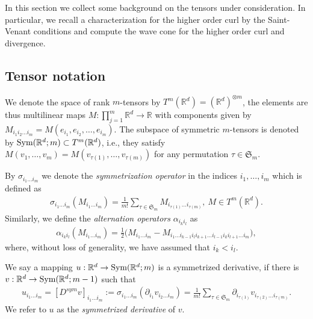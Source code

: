 \documentclass[a4paper, 10pt, twoside, notitlepage]{amsart}
\theoremstyle{plain}
\newcommand{\R}{\mathbb{R}}
\newcommand{\p}{\partial}
\renewcommand{\S}[1]{\textup{Sym}(\R^d;#1)}
\begin{document}
	In this section we collect some background on the tensors under consideration. In particular, we recall a characterization for the higher order curl by the Saint-Venant
	conditions and compute the wave cone for the higher order curl and divergence.
	
	\subsection{Tensor notation}
	\label{sec:tensors}
	
	We denote the space of rank $m$-tensors by $T^m(\R^d) = (\R^d)^{\otimes m}$, the elements are thus multilinear maps $M:\prod_{j=1}^m \R^d \to \R$ 
	with components given by $M_{i_1 i_2 \dots i_m} = M(e_{i_1},e_{i_2},\dots,e_{i_m})$.  The subspace of symmetric $m$-tensors is denoted by $\S{m} \subset T^m(\R^d)$, i.e., they satisfy
	$M(v_1,\dots,v_m) = M(v_{\tau(1)},\dots,v_{\tau(m)})$ for any permutation $\tau \in \mathfrak{S}_m$.
	
	By $\sigma_{i_1 \dots i_m}$ we denote the \emph{symmetrization operator} in the indices $i_1,\dots,i_m$ which is defined as
	\begin{align*}
		\sigma_{i_1 \dots i_m}(M_{i_1 \dots i_m}) = \frac{1}{m!} \sum_{\tau \in \mathfrak{S}_m} M_{i_{\tau(1)} \dots i_{\tau(m)}}, \ M \in T^m(\R^d).
	\end{align*}
	Similarly, we define the \emph{alternation operators} $\alpha_{i_k i_l}$ as
	\begin{align}
	\label{eq:antisym}
		\alpha_{i_k i_l} (M_{i_1 \dots i_m}) = \frac{1}{2} \Big(M_{i_1 \dots i_m} - M_{i_1 \dots i_{k-1} i_l i_{k+1} \dots i_{l-1} i_k i_{l+1} \dots i_m}\Big),
	\end{align}
	where, without loss of generality, we have assumed that $i_k < i_l$.
	
	We say a mapping $u: \R^d \to \S{m}$ is a symmetrized derivative, if there is $v: \R^d \to \S{m-1}$ such that
	\begin{align}\label{eq:potential}
		u_{i_1\dots i_m} = [D^{sym} v]_{i_1 \dots i_m}:= \sigma_{i_1 \dots i_m}( \p_{i_1} v_{i_2 \dots i_m}) = \frac{1}{m!} \sum_{\tau \in \mathfrak{S}_m} \p_{i_{\tau(1)}} v_{i_{\tau(2)} \dots i_{\tau(m)}}.
	\end{align}
	We refer to $u$ as the \emph{symmetrized derivative} of $v$.
	
\end{document}
